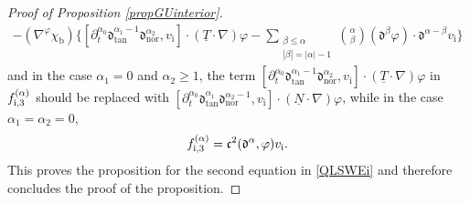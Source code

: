 \documentclass[JEP,XML,SOM,Unicode,NoFloatCountersInSection,published]{cedram}
\newcommand{\dtan}{{\mathfrak d}_\mathrm{tan}}
\newcommand{\dnor}{{\mathfrak d}_\mathrm{nor}}
\newcommand{\dt}{\partial_t}
\newcommand{\ul}[1]{\underline{#1}}
\theoremstyle{definition}
\begin{document}
\begin{proof}[Proof of Proposition \ref{propGUinterior}]
\begin{multline}
- (\nabla^\varphi\chi_\mathrm{b})\biggl\{ [\dt^{\alpha_0}\dtan^{\alpha_1-1}\dnor^{\alpha_2},v_\mathrm{i}]\cdot(\ul{T}\cdot\nabla)\varphi
- \sum_{\substack{\beta\leq\alpha\\ |\beta|=|\alpha|-1}} \binom{\alpha}{\beta}(\mathfrak{d}^{\beta}\varphi)\cdot\mathfrak{d}^{\alpha-\beta}v_\mathrm{i} \biggr\}
\end{multline}
and in the case $\alpha_1=0$ and $\alpha_2\geq1$, the term $[\dt^{\alpha_0}\dtan^{\alpha_1-1}\dnor^{\alpha_2},v_\mathrm{i}]\cdot(\ul{T}\cdot\nabla)\varphi$
in $f_{{\rm i},3}^{(\alpha)}$ should be replaced with $[\dt^{\alpha_0}\dtan^{\alpha_1}\dnor^{\alpha_2-1},v_\mathrm{i}]\cdot(\ul{N}\cdot\nabla)\varphi$,
while in the case $\alpha_1=\alpha_2=0$,
\begin{equation}\label{deffi3bis}
f_{{\rm i},3}^{(\alpha)} = \mathfrak{c}^2(\mathfrak{d}^\alpha,\varphi)v_\mathrm{i}.
\end{equation}
This proves the proposition for the second equation in \eqref{QLSWEi} and therefore concludes the proof of the proposition.
\end{proof}
\end{document}
